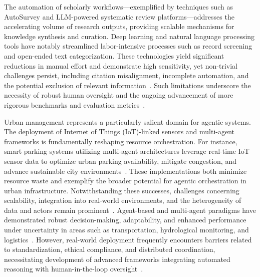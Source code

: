 \documentclass[sigconf]{acmart}
\begin{document}
The automation of scholarly workflows—exemplified by techniques such as AutoSurvey and LLM-powered systematic review platforms—addresses the accelerating volume of research outputs, providing scalable mechanisms for knowledge synthesis and curation. Deep learning and natural language processing tools have notably streamlined labor-intensive processes such as record screening and open-ended text categorization. These technologies yield significant reductions in manual effort and demonstrate high sensitivity, yet non-trivial challenges persist, including citation misalignment, incomplete automation, and the potential exclusion of relevant information~\cite{ref25,ref26,ref27,ref28,ref29,ref30,ref45,ref58,ref59,ref76,ref80,ref86,ref88,ref91,ref92,ref93,ref94,ref95,ref96,ref97,ref98,ref99,ref100,ref104}. Such limitations underscore the necessity of robust human oversight and the ongoing advancement of more rigorous benchmarks and evaluation metrics~\cite{ref29,ref30,ref45,ref99,ref100,ref104}.

Urban management represents a particularly salient domain for agentic systems. The deployment of Internet of Things (IoT)-linked sensors and multi-agent frameworks is fundamentally reshaping resource orchestration. For instance, smart parking systems utilizing multi-agent architectures leverage real-time IoT sensor data to optimize urban parking availability, mitigate congestion, and advance sustainable city environments~\cite{ref20}. These implementations both minimize resource waste and exemplify the broader potential for agentic orchestration in urban infrastructure. Notwithstanding these successes, challenges concerning scalability, integration into real-world environments, and the heterogeneity of data and actors remain prominent~\cite{ref20,ref40,ref111,ref113,ref114}. Agent-based and multi-agent paradigms have demonstrated robust decision-making, adaptability, and enhanced performance under uncertainty in areas such as transportation, hydrological monitoring, and logistics~\cite{ref40,ref45,ref91,ref92,ref93,ref111,ref113,ref114}. However, real-world deployment frequently encounters barriers related to standardization, ethical compliance, and distributed coordination, necessitating development of advanced frameworks integrating automated reasoning with human-in-the-loop oversight~\cite{ref30,ref40,ref45,ref58,ref91,ref92,ref93,ref94,ref95,ref96,ref113,ref114,ref115}.
\end{document}
